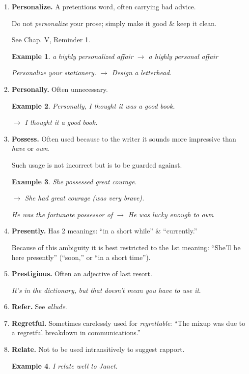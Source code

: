 \documentclass{article}
\newtheorem{example}{Example}
\begin{document}
\begin{enumerate}
	If of ``6 people'' 5 went away, how many people would be left?
	
	Answer: 1 people.
	\item {\bf Personalize.} A pretentious word, often carrying bad advice.
	
	Do not {\it personalize} your prose; simply make it good \& keep it clean.
	
	See Chap. V, Reminder 1.
	\begin{example}
		a highly personalized affair $\to$ a highly personal affair
		
		Personalize your stationery. $\to$ Design a letterhead.
	\end{example}
	\item {\bf Personally.} Often unnecessary.
	\begin{example}
		Personally, I thought it was a good book.
		
		$\to$ I thought it a good book.
	\end{example}
	\item {\bf Possess.} Often used because to the writer it sounds more impressive than {\it have} or {\it own}.
	
	Such usage is not incorrect but is to be guarded against.
	\begin{example}
		She possessed great courage.
		
		$\to$ She had great courage (was very brave).
		
		He was the fortunate possessor of $\to$ He was lucky enough to own
	\end{example}
	\item {\bf Presently.} Has 2 meanings: ``in a short while'' \& ``currently.''
	
	Because of this ambiguity it is best restricted to the 1st meaning: ``She'll be here presently'' (``soon,'' or ``in a short time'').
	\item {\bf Prestigious.} Often an adjective of last resort.
	
	{\it It's in the dictionary, but that doesn't mean you have to use it}.
	\item {\bf Refer.} See {\it allude}.
	\item {\bf Regretful.} Sometimes carelessly used for {\it regrettable}: ``The mixup was due to a regretful breakdown in communications.''
	\item {\bf Relate.} Not to be used intransitively to suggest rapport.
	\begin{example}
		I relate well to Janet.
		

\end{example}
\end{enumerate}
\end{document}
